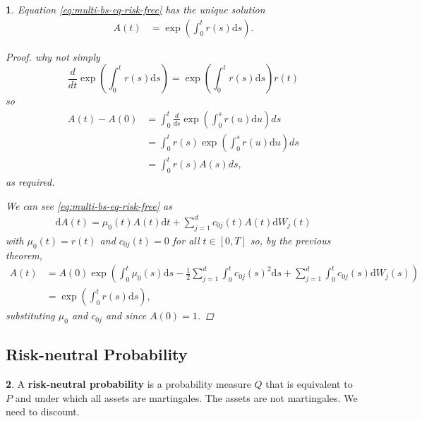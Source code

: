 \documentclass[english]{article}
\newcommand{\comment}[1]{\color{blue}#1\color{black}}
\numberwithin{equation}{section}
\numberwithin{figure}{section}
\theoremstyle{bolddescit}
\newtheorem{theorem}{\protect\theoremname}[section]
\theoremstyle{definition}
\newtheorem{definition}[theorem]{\protect\definitionname}
\theoremstyle{definition}
\theoremstyle{plain}
\theoremstyle{plain}
\theoremstyle{bolddesc}
\theoremstyle{plain}
\theoremstyle{remark}
\providecommand{\definitionname}{Definition}
\providecommand{\theoremname}{Theorem}
\begin{document}
\begin{theorem}\label{thm:bs-solution-risk-free}
  Equation \eqref{eq:multi-bs-eq-risk-free} has the unique solution
  \begin{align*}
    A(t) &= \exp \left( \int_0^t r(s) \mathrm{d}s \right).
  \end{align*}

  \begin{proof}
\comment{why not simply
\[\frac{d}{dt} \exp \left( \int_0^t r(s) \mathrm{d}s \right) = \exp \left( \int_0^t r(s) \mathrm{d}s \right) r(t)  \]
so
\begin{align*}
A(t)-A(0) & =  \int_0^t \frac{d}{ds} \exp \left( \int_0^s r(u) \mathrm{d}u \right) ds \\
& =  \int_0^t r(s)\exp \left( \int_0^s r(u) \mathrm{d}u \right) ds \\
& = \int_0^t r(s)A(s) ds,
\end{align*}
as required.
}

    We can see \eqref{eq:multi-bs-eq-risk-free} as
    \begin{align*}
      \mathrm{d}A(t) = \mu_0(t) A(t) \mathrm{d}t + \sum_{j=1}^{d} c_{0j}(t) A(t) \mathrm{d}W_j(t)
    \end{align*}
    with $\mu_0(t) = r(t)$ and $c_{0j}(t) = 0$ for all $t \in [0,T]$ so, by the previous theorem,
    \begin{align*}
      A(t) &= A(0) \exp \left( \int_0^t \mu_0(s) \mathrm{d}s - \frac{1}{2} \sum_{j=1}^{d} \int_0^t c_{0j}(s)^2 \mathrm{d}s + \sum_{j=1}^d \int_0^t c_{0j}(s) \mathrm{d}W_j(s) \right)\\
      &= \exp \left( \int_0^t r(s) \mathrm{d}s\right),
    \end{align*}
    substituting $\mu_0$ and $c_{0j}$ and since $A(0) = 1$.
  \end{proof}
\end{theorem}

\subsection{Risk-neutral Probability}

\begin{definition}
  A \textbf{risk-neutral probability} is a probability measure $Q$ that is equivalent to $P$ and under which all assets are martingales.
\comment{The assets are not martingales. We need to discount.}
\end{definition}
\end{document}
